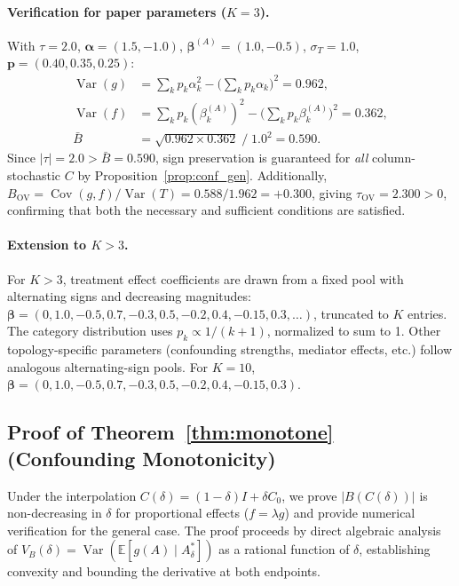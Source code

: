 \paragraph{Verification for paper parameters ($K{=}3$).}
With $\tau{=}2.0$, $\boldsymbol{\alpha}{=}(1.5,{-}1.0)$, $\boldsymbol{\beta}^{(A)}{=}(1.0,{-}0.5)$, $\sigma_T{=}1.0$, $\mathbf{p}{=}(0.40,0.35,0.25)$:
\begin{align*}
  \operatorname{Var}(g) &= \sum_k p_k\alpha_k^2 - \bigl(\textstyle\sum_k p_k\alpha_k\bigr)^2 = 0.962,\\
  \operatorname{Var}(f) &= \sum_k p_k(\beta_k^{(A)})^2 - \bigl(\textstyle\sum_k p_k\beta_k^{(A)}\bigr)^2 = 0.362,\\
  \bar{B} &= \sqrt{0.962\times 0.362}\;/\;1.0^2 = 0.590.
\end{align*}
Since $|\tau|{=}2.0 > \bar{B}{=}0.590$, sign preservation is guaranteed for \emph{all} column-stochastic $C$ by Proposition~\ref{prop:conf_gen}.
Additionally, $B_{\mathrm{OV}}=\operatorname{Cov}(g,f)/\operatorname{Var}(T)=0.588/1.962={+}0.300$, giving $\tau_{\mathrm{OV}}{=}2.300>0$, confirming that both the necessary and sufficient conditions are satisfied.

\paragraph{Extension to $K > 3$.}
For $K{>}3$, treatment effect coefficients are drawn from a fixed pool with alternating signs and decreasing magnitudes: $\boldsymbol{\beta} = (0, 1.0, {-}0.5, 0.7, {-}0.3, 0.5, {-}0.2, 0.4, {-}0.15, 0.3, \ldots)$, truncated to $K$ entries. The category distribution uses $p_k \propto 1/(k{+}1)$, normalized to sum to 1. Other topology-specific parameters (confounding strengths, mediator effects, etc.) follow analogous alternating-sign pools. For $K{=}10$, $\boldsymbol{\beta} = (0, 1.0, {-}0.5, 0.7, {-}0.3, 0.5, {-}0.2, 0.4, {-}0.15, 0.3)$.

\subsection{Proof of Theorem~\ref{thm:monotone} (Confounding Monotonicity)}
\label{app:monotonicity_proof}

Under the interpolation $C(\delta)=(1{-}\delta)I+\delta C_0$, we prove $|B(C(\delta))|$ is non-decreasing in $\delta$ for proportional effects ($f=\lambda g$) and provide numerical verification for the general case.
The proof proceeds by direct algebraic analysis of $V_B(\delta)=\operatorname{Var}(\mathbb{E}[g(A)\mid A^*_\delta])$ as a rational function of $\delta$, establishing convexity and bounding the derivative at both endpoints.

